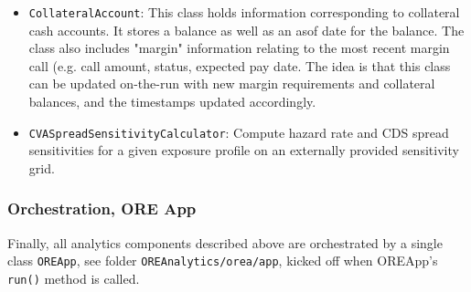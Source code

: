 \documentclass[12pt, a4paper]{report}
\begin{document}
\begin{itemize}
\item {\tt CollateralAccount}: This class holds information corresponding to collateral cash accounts. It stores a balance as well as an asof date for the balance. The class also includes "margin" information relating to the most recent margin call (e.g. call amount, status, expected pay date. The idea is that this class can be updated on-the-run with new margin requirements and collateral balances, and the timestamps updated accordingly.
\item {\tt CVASpreadSensitivityCalculator}: Compute hazard rate and CDS spread sensitivities for a given exposure profile on an externally provided sensitivity grid.
\end{itemize}

\subsubsection{Orchestration, ORE App}

Finally, all analytics components described above are orchestrated by a single class {\tt OREApp},
see folder {\tt OREAnalytics/orea/app}, kicked off when OREApp's {\tt run()} method is called.
\end{document}
